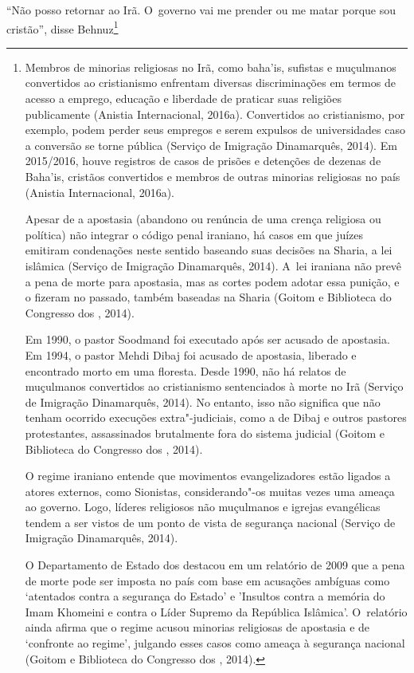 ``Não posso retornar ao Irã. O~governo vai me prender ou me matar porque
sou cristão'', disse Behnuz\footnote{Membros de minorias religiosas no Irã, como baha'is,
sufistas e muçulmanos convertidos ao cristianismo
enfrentam diversas discriminações em termos de acesso a emprego,
educação e liberdade de praticar suas religiões publicamente (Anistia
Internacional, 2016a). Convertidos ao cristianismo, por exemplo, podem
perder seus empregos e serem expulsos de universidades caso a conversão
se torne pública (Serviço de Imigração Dinamarquês, 2014). Em 2015/2016,
houve registros de casos de prisões e detenções de dezenas de Baha'is,
cristãos convertidos e membros de outras minorias religiosas no país
(Anistia Internacional, 2016a).

Apesar de a apostasia (abandono ou renúncia de uma crença religiosa ou
política) não integrar o código penal iraniano, há casos em que juízes
emitiram condenações neste sentido baseando suas decisões na Sharia, a
lei islâmica (Serviço de Imigração Dinamarquês, 2014). A~lei iraniana
não prevê a pena de morte para apostasia, mas as cortes podem adotar
essa punição, e o fizeram no passado, também baseadas na Sharia (Goitom
e Biblioteca do Congresso dos , 2014).

Em 1990, o pastor Soodmand foi executado após ser acusado de apostasia.
Em 1994, o pastor Mehdi Dibaj foi acusado de apostasia, liberado e
encontrado morto em uma floresta. Desde 1990, não há relatos de
muçulmanos convertidos ao cristianismo sentenciados à morte
 no Irã (Serviço de Imigração Dinamarquês, 2014). No entanto,
isso não significa que não tenham ocorrido execuções extra"-judiciais,
como a de Dibaj e outros pastores protestantes, assassinados brutalmente
fora do sistema judicial (Goitom e Biblioteca do Congresso dos ,
2014).

O regime iraniano entende que movimentos evangelizadores estão ligados a
atores externos, como Sionistas, considerando"-os muitas vezes uma ameaça
ao governo. Logo, líderes religiosos não muçulmanos e igrejas
evangélicas tendem a ser vistos de um ponto de vista de segurança
nacional (Serviço de Imigração Dinamarquês, 2014).

O Departamento de Estado dos  destacou em um relatório de 2009 que a
pena de morte pode ser imposta no país com base em acusações ambíguas
como `atentados contra a segurança do Estado' e 'Insultos contra a
memória do Imam Khomeini e contra o Líder Supremo da República
Islâmica'. O~relatório ainda afirma que o regime acusou minorias
religiosas de apostasia e de `confronte ao regime', julgando esses casos
como ameaça à segurança nacional (Goitom e Biblioteca do Congresso dos
, 2014).

}
